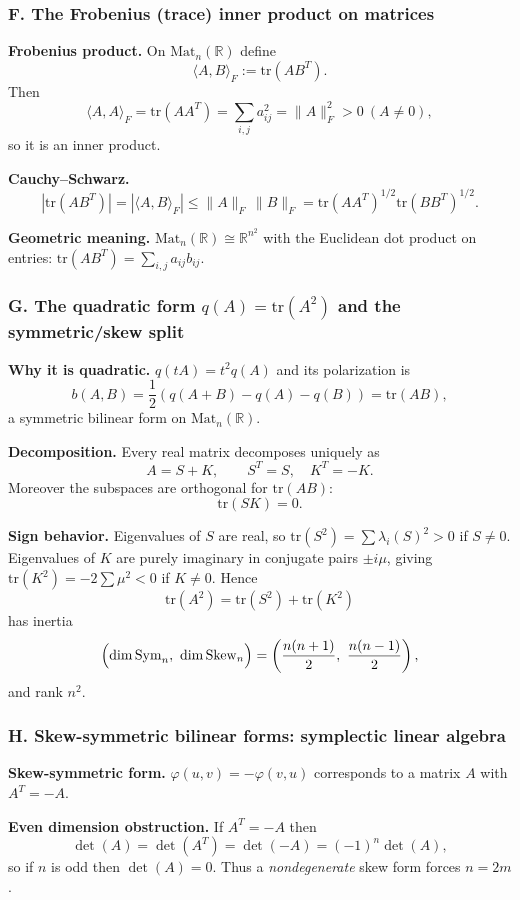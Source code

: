 \documentclass[12pt,a4paper]{article}
\theoremstyle{plain}
\theoremstyle{definition}      %
\begin{document}
\subsubsection*{F. The Frobenius (trace) inner product on matrices}

\textbf{Frobenius product.}
On $\mathrm{Mat}_n(\mathbb R)$ define
\[
\langle A,B\rangle_F := \mathrm{tr}(AB^T).
\]
Then
\[
\langle A,A\rangle_F = \mathrm{tr}(AA^T)=\sum_{i,j}a_{ij}^2=\|A\|_F^2>0\ (A\neq 0),
\]
so it is an inner product.

\textbf{Cauchy--Schwarz.}
\[
|\mathrm{tr}(AB^T)| = |\langle A,B\rangle_F|
\le \|A\|_F\,\|B\|_F
= \mathrm{tr}(AA^T)^{1/2}\mathrm{tr}(BB^T)^{1/2}.
\]

\textbf{Geometric meaning.}
$\mathrm{Mat}_n(\mathbb R)\cong \mathbb R^{n^2}$ with the Euclidean dot product on entries:
$\mathrm{tr}(AB^T)=\sum_{i,j}a_{ij}b_{ij}$.

\subsubsection*{G. The quadratic form $q(A)=\mathrm{tr}(A^2)$ and the symmetric/skew split}

\textbf{Why it is quadratic.}
$q(tA)=t^2q(A)$ and its polarization is
\[
b(A,B)=\frac12(q(A+B)-q(A)-q(B))=\mathrm{tr}(AB),
\]
a symmetric bilinear form on $\mathrm{Mat}_n(\mathbb R)$.

\textbf{Decomposition.}
Every real matrix decomposes uniquely as
\[
A=S+K,\qquad S^T=S,\quad K^T=-K.
\]
Moreover the subspaces are orthogonal for $\mathrm{tr}(AB)$:
\[
\mathrm{tr}(SK)=0.
\]

\textbf{Sign behavior.}
Eigenvalues of $S$ are real, so $\mathrm{tr}(S^2)=\sum \lambda_i(S)^2>0$ if $S\neq 0$.
Eigenvalues of $K$ are purely imaginary in conjugate pairs $\pm i\mu$, giving $\mathrm{tr}(K^2)=-2\sum \mu^2<0$ if $K\neq 0$.
Hence
\[
\mathrm{tr}(A^2)=\mathrm{tr}(S^2)+\mathrm{tr}(K^2)
\]
has inertia
\[
\Bigl(\dim \mathrm{Sym}_n,\ \dim \mathrm{Skew}_n\Bigr)
=
\left(\frac{n(n+1)}2,\ \frac{n(n-1)}2\right),
\]
and rank $n^2$.

\subsubsection*{H. Skew-symmetric bilinear forms: symplectic linear algebra}

\textbf{Skew-symmetric form.}
$\varphi(u,v)=-\varphi(v,u)$ corresponds to a matrix $A$ with $A^T=-A$.

\textbf{Even dimension obstruction.}
If $A^T=-A$ then
\[
\det(A)=\det(A^T)=\det(-A)=(-1)^n\det(A),
\]
so if $n$ is odd then $\det(A)=0$.
Thus a \emph{nondegenerate} skew form forces $n=2m$.
\end{document}
